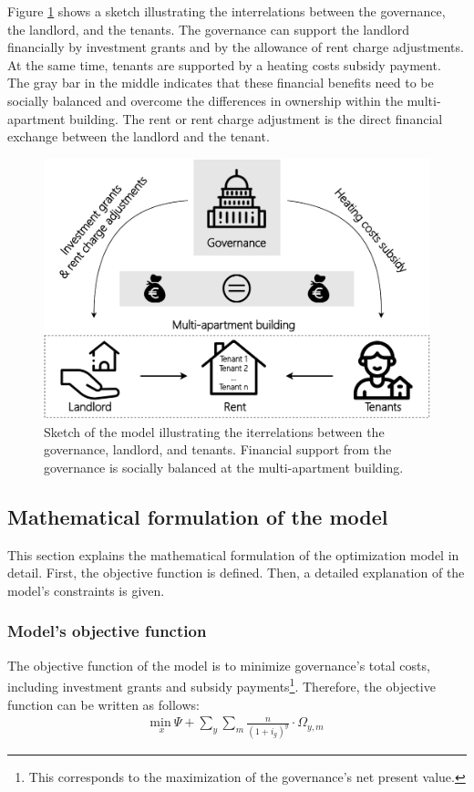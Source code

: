 Figure \ref{fig:methodology} shows a sketch illustrating the interrelations between the governance, the landlord, and the tenants. The governance can support the landlord financially by investment grants and by the allowance of rent charge adjustments. At the same time, tenants are supported by a heating costs subsidy payment. The gray bar in the middle indicates that these financial benefits need to be socially balanced and overcome the differences in ownership within the multi-apartment building. The rent or rent charge adjustment is the direct financial exchange between the landlord and the tenant.\vspace{0.5cm}

\begin{figure}[h]
	\centering
	\includegraphics[width=1\linewidth]{figures/3_Methodology/Sketch.pdf}
	\caption{Sketch of the model illustrating the iterrelations between the governance, landlord, and tenants. Financial support from the governance is socially balanced at the multi-apartment building.}
	\label{fig:methodology}
\end{figure}

\subsection{Mathematical formulation of the model}\label{met:formulas}
This section explains the mathematical formulation of the optimization model in detail. First, the objective function is defined. Then, a detailed explanation of the model's constraints is given. 

\subsubsection{Model's objective function}
The objective function of the model is to minimize governance's total costs, including investment grants and subsidy payments\footnote{This corresponds to the maximization of the governance's net present value.}. Therefore, the objective function can be written as follows: 
\begin{align}\label{objective}
\underset{x}{\mathrm{min~}} \Psi + \sum_{y} \sum_{m} \frac{n}{(1+i_g)^y} \cdot \Omega_{y,m}
\end{align}

